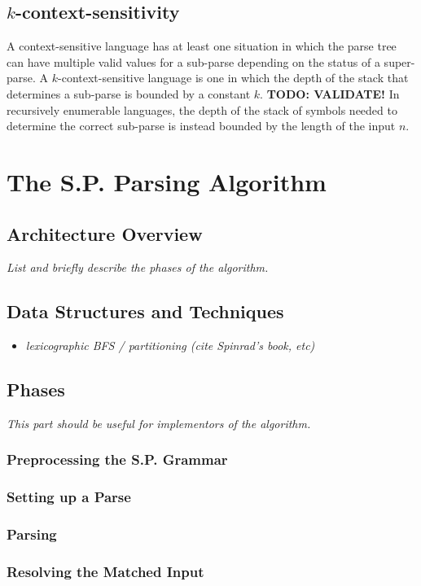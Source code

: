 \documentclass{article}
\begin{document}
\subsection{$k$-context-sensitivity}
A context-sensitive language has at least one situation in which the parse tree can have multiple valid values for a sub-parse depending on the status of a super-parse. A $k$-context-sensitive language is one in which the depth of the stack that determines a sub-parse is bounded by a constant $k$. \textbf{TODO: VALIDATE!} In recursively enumerable languages, the depth of the stack of symbols needed to determine the correct sub-parse is instead bounded by the length of the input $n$.

\section{The S.P. Parsing Algorithm}
\subsection{Architecture Overview}
\textit{List and briefly describe the phases of the algorithm.}

\subsection{Data Structures and Techniques}
\begin{itemize}
  \item \textit{lexicographic BFS / partitioning (cite Spinrad's book, etc)}
\end{itemize}

\subsection{Phases}
\textit{This part should be useful for implementors of the algorithm.}
\subsubsection{Preprocessing the S.P. Grammar}
\subsubsection{Setting up a Parse}
\subsubsection{Parsing}
\subsubsection{Resolving the Matched Input}
\end{document}
